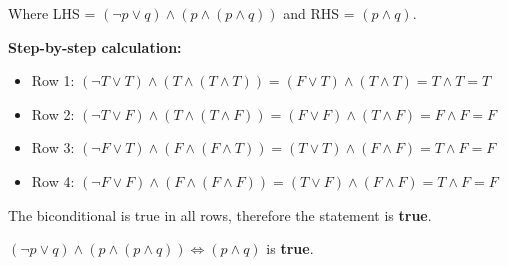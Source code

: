 \documentclass{article}
\begin{document}
    Where LHS = $(\neg p \vee q) \wedge (p \wedge (p \wedge q))$ and RHS = $(p \wedge q)$.
    
    \textbf{Step-by-step calculation:}
    \begin{itemize}
    \item Row 1: $(\neg T \vee T) \wedge (T \wedge (T \wedge T)) = (F \vee T) \wedge (T \wedge T) = T \wedge T = T$
    \item Row 2: $(\neg T \vee F) \wedge (T \wedge (T \wedge F)) = (F \vee F) \wedge (T \wedge F) = F \wedge F = F$
    \item Row 3: $(\neg F \vee T) \wedge (F \wedge (F \wedge T)) = (T \vee T) \wedge (F \wedge F) = T \wedge F = F$
    \item Row 4: $(\neg F \vee F) \wedge (F \wedge (F \wedge F)) = (T \vee F) \wedge (F \wedge F) = T \wedge F = F$
    \end{itemize}
    

    
The biconditional is true in all rows, therefore the statement is \textbf{true}.

$(\neg p \vee q) \wedge (p \wedge (p \wedge q)) \Leftrightarrow (p \wedge q)$ is \textbf{true}.
    
\end{document}
